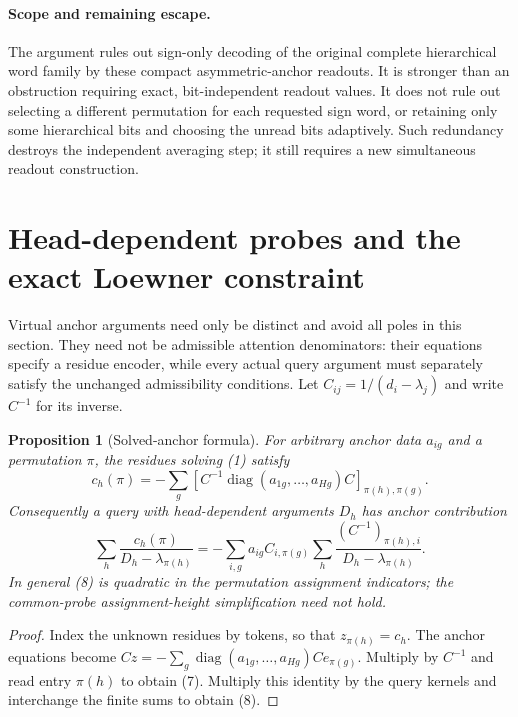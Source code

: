 \documentclass[11pt]{article}
\newtheorem{proposition}[theorem]{Proposition}
\begin{document}
\paragraph{Scope and remaining escape.}
The argument rules out sign-only decoding of the original complete
hierarchical word family by these compact asymmetric-anchor readouts.
It is stronger than an obstruction requiring exact, bit-independent
readout values. It does not rule out selecting a different permutation
for each requested sign word, or retaining only some hierarchical bits
and choosing the unread bits adaptively. Such redundancy destroys the
independent averaging step; it still requires a new simultaneous
readout construction.


\section{Head-dependent probes and the exact Loewner constraint}

Virtual anchor arguments need only be distinct and avoid all poles in
this section. They need not be admissible attention denominators:
their equations specify a residue encoder, while every actual query
argument must separately satisfy the unchanged admissibility conditions.
Let $C_{ij}=1/(d_i-\lambda_j)$ and write $C^{-1}$ for its inverse.

\begin{proposition}[Solved-anchor formula]
For arbitrary anchor data $a_{ig}$ and a permutation $\pi$, the residues
solving (1) satisfy
\[
 c_h(\pi)=-\sum_g
 \left[C^{-1}\operatorname{diag}(a_{1g},\ldots,a_{Hg})C\right]
 _{\pi(h),\pi(g)}. \tag{7}
\]
Consequently a query with head-dependent arguments $D_h$ has anchor
contribution
\[
 \sum_h\frac{c_h(\pi)}{D_h-\lambda_{\pi(h)}}
 =-\sum_{i,g}a_{ig}C_{i,\pi(g)}
       \sum_h\frac{(C^{-1})_{\pi(h),i}}{D_h-\lambda_{\pi(h)}}. \tag{8}
\]
In general (8) is quadratic in the permutation assignment indicators;
the common-probe assignment-height simplification need not hold.
\end{proposition}

\begin{proof}
Index the unknown residues by tokens, so that $z_{\pi(h)}=c_h$.
The anchor equations become
$Cz=-\sum_g \operatorname{diag}(a_{1g},\ldots,a_{Hg})Ce_{\pi(g)}$.
Multiply by $C^{-1}$ and read entry $\pi(h)$ to obtain (7).
Multiply this identity by the query kernels and interchange the finite
sums to obtain (8).
\end{proof}
\end{document}
